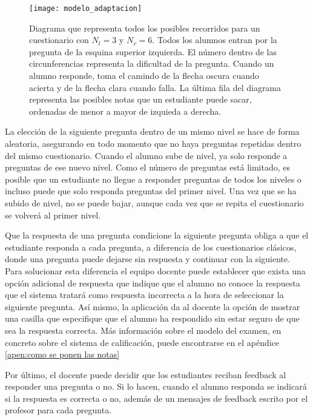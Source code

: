 \begin{figure}[htp!]
	\centering
	\texttt{[image: modelo\_adaptacion]}
	\caption[Modelo de adpatación]{Diagrama que representa todos los posibles recorridos para un cuestionario con $N_l = 3$ y $N_v = 6$. Todos los alumnos entran por la pregunta de la esquina superior izquierda. El número dentro de las circunferencias representa la dificultad de la pregunta. Cuando un alumno responde, toma el camindo de la flecha oscura cuando acierta y de la flecha clara cuando falla. La última fila del diagrama representa las posibles notas que un estudiante puede sacar, ordenadas de menor a mayor de izquieda a derecha.}
	\label{fig:modelo de adaptacion}
\end{figure}

La elección de la siguiente pregunta dentro de un mismo nivel se hace de forma aleatoria, asegurando en todo momento que no haya preguntas repetidas dentro del mismo cuestionario. Cuando el alumno sube de nivel, ya solo responde a preguntas de ese nuevo nivel. Como el número de preguntas está limitado, es posible que un estudiante no llegue a responder preguntas de todos los niveles o incluso puede que solo responda preguntas del primer nivel. Una vez que se ha subido de nivel, no se puede bajar, aunque cada vez que se repita el cuestionario se volverá al primer nivel.

Que la respuesta de una pregunta condicione la siguiente pregunta obliga a que el estudiante responda a cada pregunta, a diferencia de los cuestionarios clásicos, donde una pregunta puede dejarse sin respuesta y continuar con la siguiente. Para solucionar esta diferencia el equipo docente puede establecer que exista una opción adicional de respuesta que indique que el alumno no conoce la respuesta que el sistema tratará como respuesta incorrecta a la hora de seleccionar la siguiente pregunta. Así mismo, la aplicación da al docente la opción de mostrar una casilla que especifique que el alumno ha respondido sin estar seguro de que sea la respuesta correcta. Más información sobre el modelo del examen, en concreto sobre el sistema de calificación, puede encontrarse en el apéndice \ref{apen:como se ponen las notas}

Por último, el docente puede decidir que los estudiantes reciban feedback al responder una pregunta o no. Si lo hacen, cuando el alumno responda se indicará si la respuesta es correcta o no, además de un mensajes de feedback escrito por el profesor para cada pregunta.


